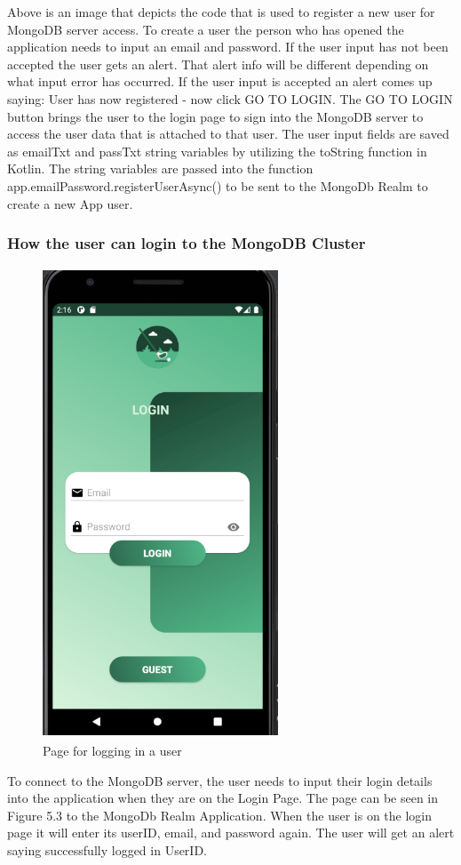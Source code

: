 Above is an image that depicts the code that is used to register a new user for MongoDB server access. To create a user the person who has opened the application needs to input an email and password. If the user input has not been accepted the user gets an alert. That alert info will be different depending on what input error has occurred. If the user input is accepted an alert comes up saying: User has now registered - now click GO TO LOGIN. The GO TO LOGIN button brings the user to the login page to sign into the MongoDB server to access the user data that is attached to that user. 
\newline
The user input fields are saved as emailTxt and passTxt string variables by utilizing the toString function in Kotlin. The string variables are passed into the function app.emailPassword.registerUserAsync() to be sent to the MongoDb Realm to create a new App user.
\subsubsection{How the user can login to the MongoDB Cluster}
\begin{figure}[H]
    \centering
    \includegraphics[width=7cm, height = 14cm]{img/loginPage.PNG}
    \caption{Page for logging in a user}
    \label{fig:Page for logging in a user}
\end{figure}
To connect to the MongoDB server, the user needs to input their login details into the application when they are on the Login Page. The page can be seen in Figure 5.3 to the MongoDb Realm Application. When the user is on the login page it will enter its userID, email, and password again. The user will get an alert saying successfully logged in UserID.

